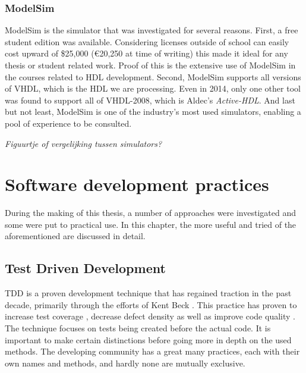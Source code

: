 \documentclass[11pt,british]{article}
\begin{document}
\label{subsec:simtool}
\subsubsection{ModelSim}
ModelSim is the simulator that was investigated for several reasons. First, a free student edition was available. Considering licenses  outside of school can easily cost upward of \$25,000 (\euro20,250 at time of writing) this made it ideal for any thesis or student related work. Proof of this is the extensive use of ModelSim in the courses related to HDL development. Second, ModelSim supports all versions of \gls{VHDL}, which is the \gls{HDL} we are processing. Even in 2014, only one other tool was found to support all of VHDL-2008, which is Aldec's \emph{Active-HDL}. And last but not least, ModelSim is one of the industry's most used simulators, enabling a pool of experience to be consulted.\cite{ModelSim}

\emph{\color{red}Figuurtje of vergelijking tussen simulators?}\\


\section{Software development practices}
During the making of this thesis, a number of approaches were investigated and some were put to practical use. In this chapter, the more useful and tried of the aforementioned are discussed in detail.


\subsection{Test Driven Development}
\gls{TDD} is a proven development technique that has regained traction in the past decade, primarily through the efforts of Kent Beck \cite{VHDLUnit}. This practice has proven to increase test coverage \cite{Siniaalto:2007:CCS:1302496.1302946}, decrease defect density \cite{TDDinpractice} as well as improve code quality \cite{TDDinpractice,conf/isese/BhatN06}. The technique focuses on tests being created before the actual code. It is important to make certain distinctions before going more in depth on the used methods. The developing community has a great many practices, each with their own names and methods, and hardly none are mutually exclusive.
\end{document}
